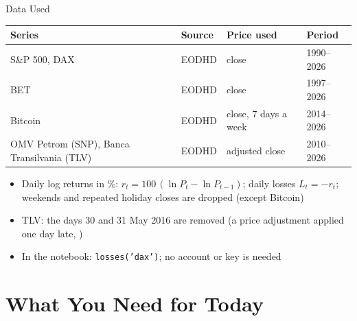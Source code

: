 \begin{frame}{Data Used}
\itemsize{\small}
\begin{center}
\footnotesize
\begin{tabular}{llll}
\toprule
\textbf{Series} & \textbf{Source} & \textbf{Price used} & \textbf{Period} \\
\midrule
S\&P 500, DAX & EODHD & close & 1990--2026 \\
BET & EODHD & close & 1997--2026 \\
Bitcoin & EODHD & close, 7 days a week & 2014--2026 \\
OMV Petrom (SNP), Banca Transilvania (TLV) & EODHD & adjusted close & 2010--2026 \\
\bottomrule
\end{tabular}
\end{center}
\begin{itemize}
    \item Daily log returns in \%: $r_t = 100\,(\ln P_t - \ln P_{t-1})$; daily losses $L_t = -r_t$; weekends and repeated holiday closes are dropped (except Bitcoin)
    \item TLV: the days 30 and 31 May 2016 are removed (a price adjustment applied one day late, )
    \item In the notebook: \texttt{losses('dax')}; no account or key is needed
\end{itemize}
\end{frame}


\section{What You Need for Today}

